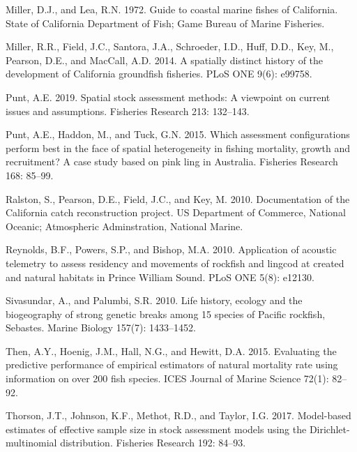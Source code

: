 \documentclass[11pt,
  english,
  a4paper,
]{article}
\newlength{\cslhangindent}
\newenvironment{CSLReferences}[2] %
 {%
  \setlength{\parindent}{0pt}
  \ifodd #1 \everypar{\setlength{\hangindent}{\cslhangindent}}\ignorespaces\fi
  \ifnum #2 > 0
  \setlength{\parskip}{#2\baselineskip}
  \fi
 }%
 {}
\begin{document}
\begin{CSLReferences}{1}{0}
\leavevmode{}%
Miller, D.J., and Lea, R.N. 1972. Guide to coastal marine fishes of {California}. State of California Department of Fish; Game Bureau of Marine Fisheries.

\leavevmode{}%
Miller, R.R., Field, J.C., Santora, J.A., Schroeder, I.D., Huff, D.D., Key, M., Pearson, D.E., and MacCall, A.D. 2014. A spatially distinct history of the development of {California} groundfish fisheries. PLoS ONE 9(6): e99758.

\leavevmode{}%
Punt, A.E. 2019. Spatial stock assessment methods: {A} viewpoint on current issues and assumptions. Fisheries Research 213: 132--143.

\leavevmode{}%
Punt, A.E., Haddon, M., and Tuck, G.N. 2015. Which assessment configurations perform best in the face of spatial heterogeneity in fishing mortality, growth and recruitment? {A} case study based on pink ling in {Australia}. Fisheries Research 168: 85--99.

\leavevmode{}%
Ralston, S., Pearson, D.E., Field, J.C., and Key, M. 2010. Documentation of the {California} catch reconstruction project. US Department of Commerce, National Oceanic; Atmospheric Adminstration, National Marine.

\leavevmode{}%
Reynolds, B.F., Powers, S.P., and Bishop, M.A. 2010. Application of acoustic telemetry to assess residency and movements of rockfish and lingcod at created and natural habitats in {Prince} {William} {Sound}. PLoS ONE 5(8): e12130.

\leavevmode{}%
Sivasundar, A., and Palumbi, S.R. 2010. Life history, ecology and the biogeography of strong genetic breaks among 15 species of {Pacific} rockfish, {Sebastes}. Marine Biology 157(7): 1433--1452.

\leavevmode{}%
Then, A.Y., Hoenig, J.M., Hall, N.G., and Hewitt, D.A. 2015. Evaluating the predictive performance of empirical estimators of natural mortality rate using information on over 200 fish species. ICES Journal of Marine Science 72(1): 82--92.

\leavevmode{}%
Thorson, J.T., Johnson, K.F., Methot, R.D., and Taylor, I.G. 2017. Model-based estimates of effective sample size in stock assessment models using the {Dirichlet}-multinomial distribution. Fisheries Research 192: 84--93.


\end{CSLReferences}
\end{document}
